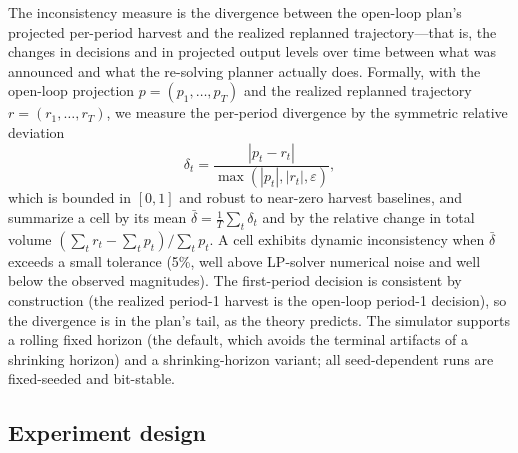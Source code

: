 The inconsistency measure is the divergence between the open-loop plan's projected per-period harvest and the realized replanned trajectory---that is, the changes in decisions and in projected output levels over time between what was announced and what the re-solving planner actually does. Formally, with the open-loop projection \(p = (p_1, \ldots, p_T)\) and the realized replanned trajectory \(r = (r_1, \ldots, r_T)\), we measure the per-period divergence by the symmetric relative deviation
\begin{equation}
\delta_t = \frac{|p_t - r_t|}{\max(|p_t|, |r_t|, \varepsilon)},
\label{eq:metric}
\end{equation}
which is bounded in \([0, 1]\) and robust to near-zero harvest baselines, and summarize a cell by its mean \(\bar\delta = \frac{1}{T}\sum_t \delta_t\) and by the relative change in total volume \((\sum_t r_t - \sum_t p_t)/\sum_t p_t\). A cell exhibits dynamic inconsistency when \(\bar\delta\) exceeds a small tolerance (5\%, well above LP-solver numerical noise and well below the observed magnitudes). The first-period decision is consistent by construction (the realized period-1 harvest is the open-loop period-1 decision), so the divergence is in the plan's tail, as the theory predicts. The simulator supports a rolling fixed horizon (the default, which avoids the terminal artifacts of a shrinking horizon) and a shrinking-horizon variant; all seed-dependent runs are fixed-seeded and bit-stable.

\hypertarget{experiment-design}{%
\subsection{Experiment design}\label{experiment-design}}

